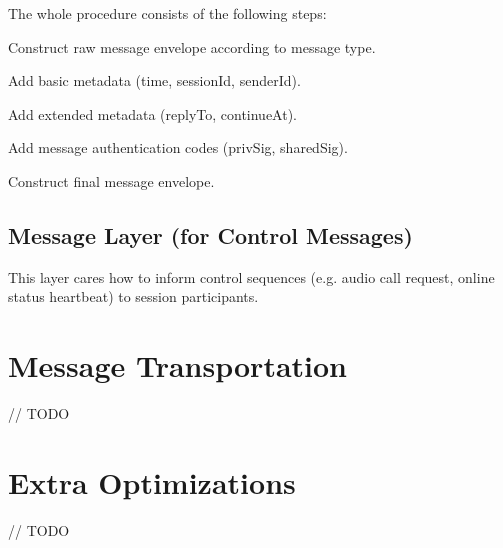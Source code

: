 The whole procedure consists of the following steps:

\begin{compactitem}
    \item Construct raw message envelope according to message type.
    \item Add basic metadata (time, sessionId, senderId).
    \item Add extended metadata (replyTo, continueAt).
    \item Add message authentication codes (privSig, sharedSig).
    \item Construct final message envelope.
\end{compactitem}

\subsection{Message Layer (for Control Messages)}

This layer cares how to inform control sequences (e.g. audio call request, online status heartbeat) to session participants.








\section{Message Transportation}

// TODO










\section{Extra Optimizations}

// TODO











